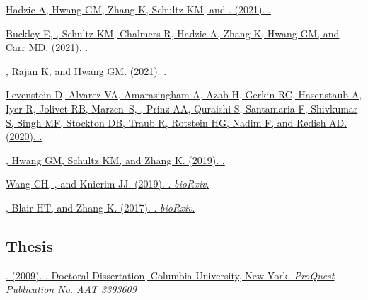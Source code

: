 \begin{description}
  \item \href{https://arxiv.org/abs/2111.00599}{Hadzic A, Hwang GM, Zhang K,
      Schultz KM, and . (2021). .
    }
  \item \href{https://arxiv.org/abs/2109.05545}{Buckley E, ,
      Schultz KM, Chalmers R, Hadzic A, Zhang K, Hwang GM, and Carr MD. (2021).
    . }
  \item \href{https://arxiv.org/abs/2105.07284}
    {, Rajan K, and Hwang GM. (2021). .
    }
  \item \href{https://arxiv.org/abs/2003.13825}
    {Levenstein D, Alvarez VA, Amarasingham A, Azab H, Gerkin RC, Hasenstaub
      A, Iyer R, Jolivet RB, Marzen~S, , Prinz AA, Quraishi
      S, Santamaria F, Shivkumar S, Singh MF, Stockton DB, Traub R, Rotstein
      HG, Nadim F, and Redish AD. (2020). . }
  \item \href{https://arxiv.org/abs/1909.06711}
    {, Hwang GM, Schultz KM, and Zhang K. (2019).
    . }
  \item \href{https://dx.doi.org/10.1101/764282}
    {Wang CH, , and Knierim JJ. (2019). . \emph{bioRxiv}.
    }
  \item \href{https://dx.doi.org/10.1101/211458}
    {, Blair HT, and Zhang K. (2017). . \emph{bioRxiv}. }
\end{description}

\subsection*{Thesis}

\begin{description}
  \item \href{https://search.proquest.com/docview/304862872/abstract}
    {. (2009). . Doctoral Dissertation, Columbia University, New
    York. \emph{ProQuest Publication No. AAT 3393609}}
\end{description}

